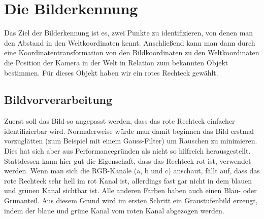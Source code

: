\section{Die Bilderkennung}

Das Ziel der Bilderkennung ist es, zwei Punkte zu identifizieren, von denen man den Abstand in den Weltkoordinaten kennt. Anschließend kann man dann durch eine Koordinatentransformation von den Bildkoordinaten zu den Weltkoordinaten die Position der Kamera in der Welt in Relation zum bekannten Objekt bestimmen. Für dieses Objekt haben wir ein rotes Rechteck gewählt.

\subsection{Bildvorverarbeitung}

Zuerst soll das Bild so angepasst werden, dass das rote Rechteck einfacher identifizierbar wird. Normalerweise würde man damit beginnen das Bild erstmal vorzuglätten (zum Beispiel mit einem Gauss-Filter) um Rauschen zu minimieren. Dies hat sich aber aus Performancegründen als nicht so hilfreich herausgestellt. Stattdessen kann hier gut die Eigenschaft, dass das Rechteck rot ist, verwendet werden. Wenn man sich die RGB-Kanäle (a, b und c) anschaut, fällt auf, dass das rote Rechteck sehr hell im rot Kanal ist, allerdings fast gar nicht in dem blauen und grünen Kanal sichtbar ist. Alle anderen Farben haben auch einen Blau- oder Grünanteil. Aus diesem Grund wird im ersten Schritt ein Graustufenbild erzeugt, indem der blaue und grüne Kanal vom roten Kanal abgezogen werden.

